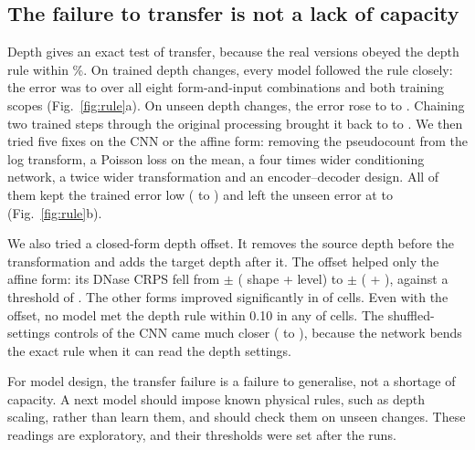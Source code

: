 \documentclass[pdflatex,sn-mathphys-num]{sn-jnl}
\newcommand{\lit}[1]{#1}
\begin{document}
\subsection{The failure to transfer is not a lack of capacity}\label{sec:r5}

Depth gives an exact test of transfer, because the real versions obeyed the depth rule within
\lawData\%. On trained depth changes, every model followed the rule closely: the error was
 to  over all eight form-and-input combinations and both training scopes
(Fig.~\ref{fig:rule}a). On unseen depth changes, the error rose to  to
. Chaining two trained steps through the original processing brought it back to
 to . We then tried five fixes on the CNN or the affine form: removing
the pseudocount from the log transform, a Poisson loss on the mean, a four times wider
conditioning network, a twice wider transformation and an encoder--decoder design. All of them
kept the trained error low (\fixTrLo{} to \fixTrHi{}) and left the unseen error at \fixNeverLo{}
to \fixNeverHi{} (Fig.~\ref{fig:rule}b).

We also tried a closed-form depth offset. It removes the source depth before the
transformation and adds the target depth after it. The offset helped only the affine form: its
DNase CRPS fell from \oldA{} $\pm$ \oldAw{} (\oldAOS{} shape + \oldASE{} level) to \offA{}
$\pm$ \offAw{} (\offAOS{} + \offASE{}), against a threshold of \offBar{}. The other forms improved
significantly in \offBDclear{} of \offBDn{} cells. Even with the offset, no model met the depth
rule within \lit{0.10} in any of \offLawN{} cells. The shuffled-settings controls of the CNN came
much closer (\offTwinLo{} to \offTwinHi{}), because the network bends the exact rule when it can
read the depth settings.

For model design, the transfer failure is a failure to generalise, not a shortage of capacity.
A next model should impose known physical rules, such as depth scaling, rather than learn them,
and should check them on unseen changes. These readings are exploratory, and their thresholds
were set after the runs.
\end{document}
